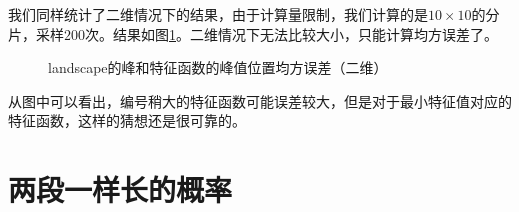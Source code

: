 \documentclass[12pt,a4paper]{article}
\begin{document}
我们同样统计了二维情况下的结果，由于计算量限制，我们计算的是$10\times10$的分片，采样$200$次。结果如图\ref{ml3}。二维情况下无法比较大小，只能计算均方误差了。
\begin{figure}[h]
\centering
{}
\caption{landscape的峰和特征函数的峰值位置均方误差（二维）}
\label{ml3}
\end{figure}

从图中可以看出，编号稍大的特征函数可能误差较大，但是对于最小特征值对应的特征函数，这样的猜想还是很可靠的。

\section*{两段一样长的概率}
\end{document}
